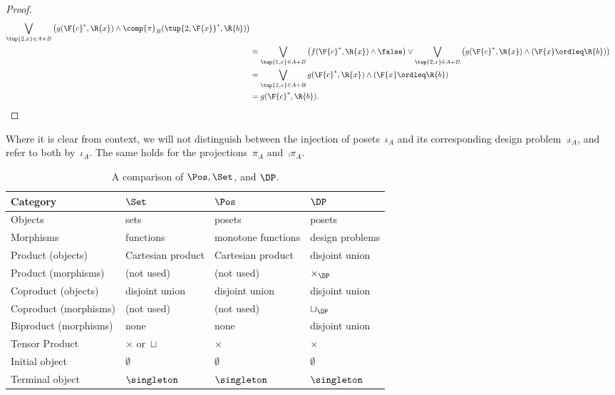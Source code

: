 \begin{proof}
\begin{equation}
\begin{aligned}
    \bigvee_{\tup{2,x}\in A+B}\left( g(\F{c}^*,\R{x}) \wedge \comp{\pi}_B(\tup{2,\F{x}}^*,\R{b})\right)\\
    &=\bigvee_{\tup{1,x}\in A+B}\left( f(\F{c}^*,\R{x}) \wedge \false \right) \vee 
    \bigvee_{\tup{2,x}\in A+B}\left( g(\F{c}^*,\R{x}) \wedge (\F{x}\ordleq \R{b}) \right)\\
    &=\bigvee_{\tup{2,x}\in A+B} g(\F{c}^*,\R{x}) \wedge (\F{x}\ordleq \R{b}) \\
    &=g(\F{c}^*,\R{b}).
    \end{aligned}
\end{equation}
\end{proof}

\begin{remark}Where it is clear from context, we will not distinguish between the injection of posets~$\iota_A$ and its corresponding design problem~$\comp{\iota_A}$, and refer to both by~$\iota_A$. The same holds for the projections~$\pi_A$ and~$\comp{\pi_A}$.
\end{remark}

\begin{table}[b]
\begin{small}
\begin{center}
\begin{tabular}{llll}
    Category&$\Set$&$\Pos$&$\DP$\\
    \hline
    Objects&sets&posets&posets\\
    Morphisms &functions&monotone functions&design problems\\
    Product (objects) &Cartesian product& Cartesian product& disjoint union\\
    Product (morphisms) &(not used)&(not used)&$\times_\DP$\\
    Coproduct (objects) &disjoint union&disjoint union&disjoint union\\
    Coproduct (morphisms) &(not used)&(not used)&$\sqcup_\DP$\\
    Biproduct (morphisms)& none&none& disjoint union\\
    Tensor Product &$\times$ or~$\sqcup$&$\times$&$\times$\\
    Initial object &$\emptyset$&$\emptyset$&$\emptyset$\\
    Terminal object &$\singleton$&$\singleton$&$\singleton$
\end{tabular}
\end{center}
\end{small}
\caption{A comparison of $\Pos, \Set$, and $\DP$.}
\end{table}

